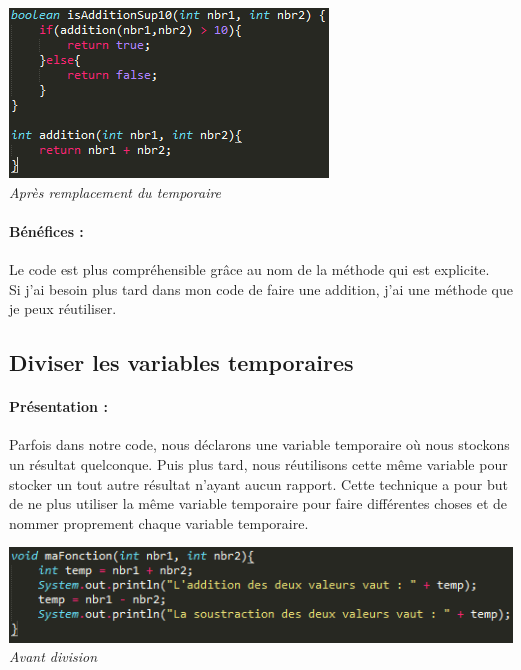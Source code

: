 \documentclass[a4paper,twoside,12pt,openright]{report}
\begin{document}
\begin{center}
\includegraphics[scale=1]{Image/Remplacement_Temp_Methode2.png}\\
\itshape{Après remplacement du temporaire}
\end{center}

\paragraph{Bénéfices :}
Le code est plus compréhensible grâce au nom de la méthode qui est explicite.\\
Si j'ai besoin plus tard dans mon code de faire une addition, j'ai une méthode que je peux réutiliser.\\

\newpage

\subsection{Diviser les variables temporaires}
\paragraph{Présentation :}
Parfois dans notre code, nous déclarons une variable temporaire où nous stockons un résultat quelconque. Puis plus tard, nous réutilisons cette même variable pour stocker un tout autre résultat n'ayant aucun rapport.
Cette technique a pour but de ne plus utiliser la même variable temporaire pour faire différentes choses et de nommer proprement chaque variable temporaire.

\begin{center}
\includegraphics[scale=1]{Image/Diviser_Temp.png}\\
\itshape{Avant division}
\end{center}
\end{document}
